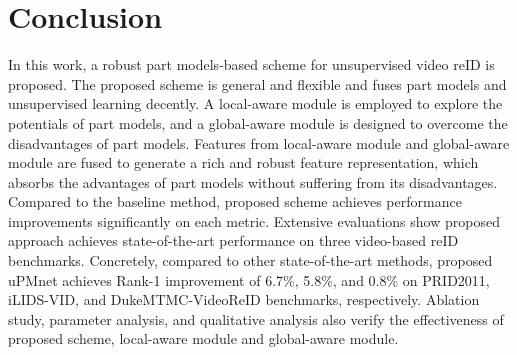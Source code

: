 \documentclass{cta-author}
\begin{document}
	

	\section{Conclusion}\label{conlusion}
	In this work, a robust part models-based scheme for unsupervised video reID is proposed. The proposed scheme is general and flexible and fuses part models and unsupervised learning decently. A local-aware module is employed to explore the potentials of part models, and a global-aware module is designed to overcome the disadvantages of part models. Features from local-aware module and global-aware module are fused to generate a rich and robust feature representation, which absorbs the advantages of part models without suffering from its disadvantages. Compared to the baseline method, proposed scheme achieves performance improvements significantly on each metric. Extensive evaluations show proposed approach achieves state-of-the-art performance on three video-based reID benchmarks. Concretely, compared to other state-of-the-art methods, proposed uPMnet achieves Rank-1 improvement of 6.7\%, 5.8\%, and 0.8\% on PRID2011, iLIDS-VID, and DukeMTMC-VideoReID benchmarks, respectively. Ablation study, parameter analysis, and qualitative analysis also verify the effectiveness of proposed scheme, local-aware module and global-aware module. 
	
	\normalem
	
	
	
\end{document}
